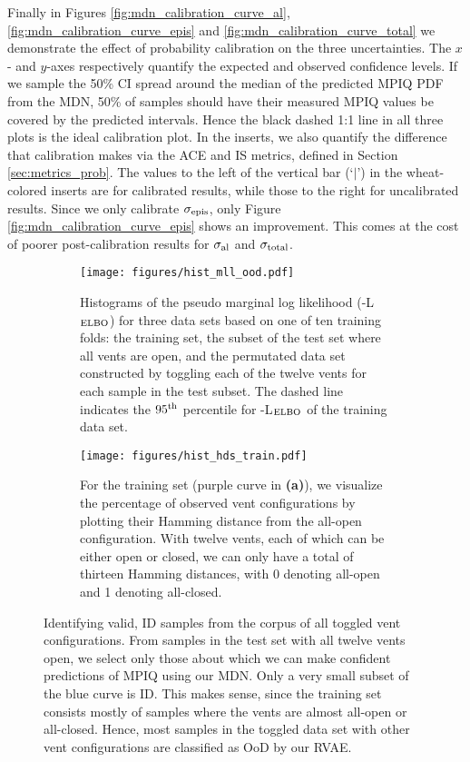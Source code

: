 Finally in Figures \ref{fig:mdn_calibration_curve_al}, \ref{fig:mdn_calibration_curve_epis} and \ref{fig:mdn_calibration_curve_total} we demonstrate the effect of probability calibration on the three uncertainties. The $x$- and $y$-axes respectively quantify the expected and observed confidence levels.  If we sample the 50\% CI spread around the median of the predicted MPIQ PDF from the MDN, 50\% of samples should have their measured MPIQ values be covered by the predicted intervals. Hence the black dashed 1:1 line in all three plots is the ideal calibration plot. In the inserts, we also quantify the difference that calibration makes via the ACE and IS metrics, defined in Section \ref{sec:metrics_prob}.  The values to the left of the vertical bar (`$\vert$') in the wheat-colored inserts are for calibrated results, while those to the right for uncalibrated results. Since we only calibrate $\sigma_{\rm epis}$, only Figure \ref{fig:mdn_calibration_curve_epis} shows an improvement. This comes at the cost of poorer post-calibration results for $\sigma_{\rm al}$ and $\sigma_{\rm total}$.

\begin{figure*}
\begin{subfigure}{0.49\textwidth}
    \centering
    \texttt{[image: figures/hist\_mll\_ood.pdf]}
    \caption{Histograms of the pseudo marginal log likelihood (-L$_{\rm ELBO}$) for three data sets based on one of ten training folds: the training set, the subset of the test set where all vents are open, and the permutated data set constructed by toggling each of the twelve vents for each sample in the test subset. The dashed line indicates the $95^{\rm th}$ percentile  for -L$_{\rm ELBO}$ of the training data set.}
    \label{fig:vae_hist_mll_ood}
\end{subfigure}
\hfill
\begin{subfigure}{0.49\textwidth}
    \centering
    \texttt{[image: figures/hist\_hds\_train.pdf]}
    \caption{For the training set (purple curve in \textbf{(a)}), we visualize the percentage of observed vent configurations by plotting their Hamming distance from the all-open configuration. With twelve vents, each of which can be either open or closed, we can only have a total of thirteen Hamming distances, with 0 denoting all-open and 1 denoting all-closed.}
    \label{fig:vae_hds_train}
\end{subfigure}
\caption{Identifying valid, ID samples from the corpus of all toggled vent configurations. From samples in the test set with all twelve vents open, we select only those about which we can make confident predictions of MPIQ using our MDN. Only a very small subset of the blue curve is ID.  This makes sense, since the training set consists mostly of samples where the vents are almost all-open or all-closed.  Hence, most samples in the toggled data set with other vent configurations are classified as OoD by our RVAE.}
\label{fig:vae_moneyplot}
\end{figure*}

